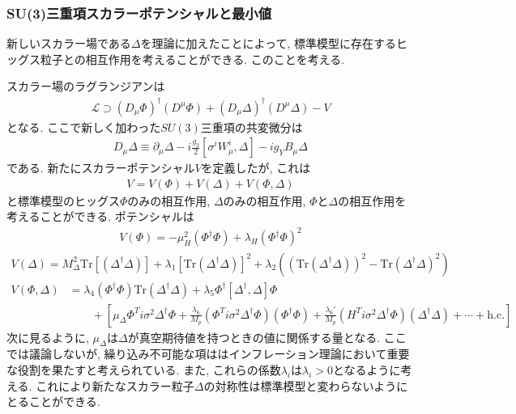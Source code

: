 \subsubsection{SU(3)三重項スカラーポテンシャルと最小値}
新しいスカラー場である$\Delta$を理論に加えたことによって, 標準模型に存在するヒッグス粒子との相互作用を考えることができる.
このことを考える.

スカラー場のラグランジアンは
\begin{align}
  \mathcal{L} \supset (D_\mu \Phi)^\dagger (D^\mu \Phi) + (D_\mu \Delta)^\dagger (D^\mu \Delta) - V\label{lagrangian_delta}
\end{align}
となる.
ここで新しく加わった$SU(3)$三重項の共変微分は
\begin{align}
  D_\mu\Delta \equiv \partial_\mu \Delta -i\frac{g_2}{2}[\sigma^i W_\mu^i, \Delta ] - ig_Y B_\mu \Delta\nonumber
\end{align}
である.
新たにスカラーポテンシャル$V$を定義したが, これは
\begin{align}
  V = V(\Phi) + V(\Delta) + V(\Phi, \Delta) \nonumber
\end{align}
と標準模型のヒッグス$\Phi$のみの相互作用, $\Delta$のみの相互作用, $\Phi$と$\Delta$の相互作用を考えることができる.
ポテンシャルは
\begin{align}
  V(\Phi) = -\mu_H^2(\Phi^\dagger \Phi) + \lambda_H (\Phi^\dagger \Phi)^2\nonumber
\end{align}
\begin{align}
  V(\Delta) = M_\Delta^2 \mathrm{Tr}[(\Delta^\dagger\Delta)]+{\lambda_1}[\mathrm{Tr}(\Delta^\dagger\Delta)]^2 + \lambda_2\left( (\mathrm{Tr}(\Delta^\dagger \Delta))^2 - \mathrm{Tr}(\Delta^\dagger \Delta)^2\right)
\end{align}
\begin{align}
  V(\Phi, \Delta) &= \lambda_4(\Phi^\dagger \Phi)\mathrm{Tr}(\Delta^\dagger \Delta) + \lambda_5 \Phi^\dagger [\Delta^\dagger , \Delta]\Phi\nonumber\\
                  &\qquad + \left[\mu_\Delta \Phi^T i\sigma^2 \Delta^\dagger \Phi + \frac{\lambda_6}{M_p}(\Phi^T i\sigma^2 \Delta^\dagger \Phi)(\Phi^\dagger \Phi) + \frac{\lambda_6'}{M_p}(H^Ti\sigma^2\Delta^\dagger\Phi)(\Delta^\dagger \Delta) + \cdots +\mathrm{h.c.}\right]\nonumber
\end{align}
次に見るように, $\mu_\Delta$は$\Delta$が真空期待値を持つときの値に関係する量となる.
ここでは議論しないが, 繰り込み不可能な項ははインフレーション理論において重要な役割を果たすと考えられている.
また, これらの係数$\lambda_i$は$\lambda_i>0$となるように考える.
これにより新たなスカラー粒子$\Delta$の対称性は標準模型と変わらないようにとることができる.

